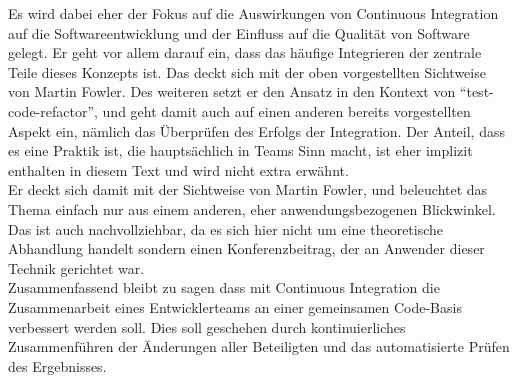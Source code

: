 Es wird dabei eher der Fokus auf die Auswirkungen von Continuous Integration auf die Softwareentwicklung und der Einfluss auf die Qualität von Software gelegt. Er geht vor allem darauf ein, dass das häufige Integrieren der zentrale Teile dieses Konzepts ist. Das deckt sich mit der oben vorgestellten Sichtweise von Martin Fowler. Des weiteren setzt er den Ansatz in den Kontext von "`test-code-refactor"', und geht damit auch auf einen anderen bereits vorgestellten Aspekt ein, nämlich das Überprüfen des Erfolgs der Integration. Der Anteil, dass es eine Praktik ist, die hauptsächlich in Teams Sinn macht, ist eher implizit enthalten in diesem Text und wird nicht extra erwähnt.\\
Er deckt sich damit mit der Sichtweise von Martin Fowler, und beleuchtet das Thema einfach nur aus einem anderen, eher anwendungsbezogenen Blickwinkel. Das ist auch nachvollziehbar, da es sich hier nicht um eine theoretische Abhandlung handelt sondern einen Konferenzbeitrag, der an Anwender dieser Technik gerichtet war.\\

Zusammenfassend bleibt zu sagen dass mit Continuous Integration die Zusammenarbeit eines Entwicklerteams an einer gemeinsamen Code-Basis verbessert werden soll. Dies soll geschehen durch kontinuierliches Zusammenführen der Änderungen aller Beteiligten und das automatisierte Prüfen des Ergebnisses.
